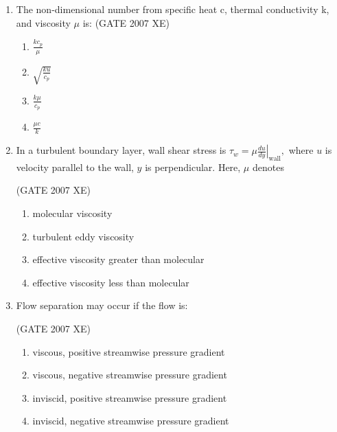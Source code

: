 \documentclass[journal,cmex10]{IEEEtran}
\theoremstyle{remark}
\numberwithin{equation}{enumi}
\numberwithin{figure}{enumi}
\begin{document}
\begin{enumerate}

\item The non-dimensional number from specific heat c, thermal conductivity k, and viscosity $\mu$ is:  
\hfill{(GATE 2007 XE)}
\begin{multicols}{4}
\begin{enumerate}
    \item $\frac{k c_p}{\mu}$
    \item $\sqrt{\frac{k u}{c_p}}$
    \item $\frac{k \mu}{c_p}$
    \item $\frac{\mu c}{k}$
\end{enumerate}
\end{multicols}


\item In a turbulent boundary layer, wall shear stress is  
$\tau_w = \mu \left.\frac{du}{dy}\right|_{\text{wall}}, $  
where $u$ is velocity parallel to the wall, $y$ is perpendicular. Here, $\mu$ denotes

\hfill{(GATE 2007 XE)}
\begin{multicols}{2}
\begin{enumerate}
    \item molecular viscosity
    \item turbulent eddy viscosity
    \item effective viscosity greater than molecular
    \item effective viscosity less than molecular
\end{enumerate}
\end{multicols}

\newpage
\item Flow separation may occur if the flow is:

\hfill{(GATE 2007 XE)}
\begin{multicols}{2}
\begin{enumerate}
    \item viscous, positive streamwise pressure gradient
    \item viscous, negative streamwise pressure gradient
    \item inviscid, positive streamwise pressure gradient
    \item inviscid, negative streamwise pressure gradient
\end{enumerate}
\end{multicols}


\end{enumerate}
\end{document}
